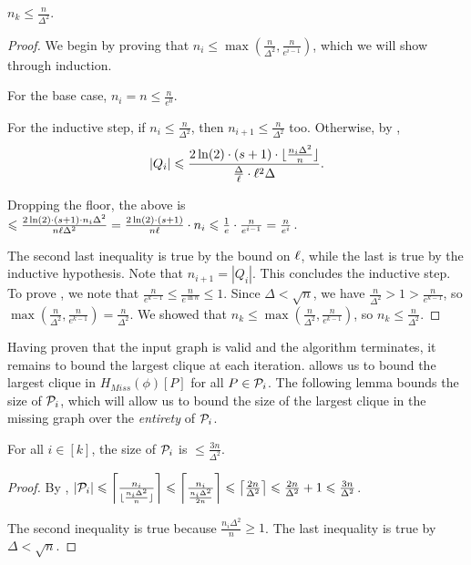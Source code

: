 \documentclass[11pt]{article}
\begin{document}
\begin{lemma}\label{algorithm-finishes}
$n_k\le \frac n{\Delta^2}$. 
\end{lemma}
\begin{proof}
    We begin by proving that $n_i\le \max(\frac n{\Delta^2}, \frac{n}{e^{i-1}})$, which we will show through induction.

    For the base case, $n_i=n\le\frac n{e^0}$. 

    For the inductive step, if $n_i\le \frac n{\Delta^2}$, then $n_{i+1}\le \frac n{\Delta^2}$ too. Otherwise, by , 
    \begin{align*}
        |Q_i|\leqslant\frac{2\ln(2)\cdot(s+1)\cdot\lfloor \frac{n_i\Delta^2}{n}\rfloor}{\frac{\Delta}{\ell}\cdot {\ell}^2\Delta}.
    \end{align*}

    Dropping the floor, the above is $\leqslant \frac{2\ln(2)\cdot (s+1)\cdot n_i\Delta^2}{n{\ell}\Delta^2}=\frac{2\ln(2)\cdot(s+1)}{n{\ell}}\cdot n_i\leqslant \frac 1e\cdot \frac n{e^{i-1}}=\frac n{e^i}$. 

    The second last inequality is true by the bound on ${\ell}$, while the last is true by the inductive hypothesis. Note that $n_{i+1}=|Q_i|$. This concludes the inductive step. \\
    
    To prove , we note that $\frac n{e^{k-1}}\le \frac n{e^{\ln n}}\le 1$. Since $\Delta < \sqrt n$, we have $\frac n{\Delta^2}>1>\frac n{e^{k-1}}$, so $\max\left(\frac n{\Delta^2}, \frac n{e^{k-1}}\right)=\frac n{\Delta^2}$. We showed that $n_k\le\max\left(\frac n{\Delta^2}, \frac n{e^{k-1}}\right)$, so $n_k\le \frac n{\Delta^2}$.
\end{proof}

Having proven that the input graph is valid and the algorithm terminates, it remains to bound the largest clique at each iteration.  allows us to bound the largest clique in $H_{Miss}(\phi)[P]$ for all $P\in \mathcal{P}_i$. The following lemma bounds the size of $\mathcal{P}_i$, which will allow us to bound the size of the largest clique in the missing graph over the \textit{entirety} of $\mathcal{P}_i$. 

\begin{lemma}\label{bound-on-P_i}
For all $i\in [k]$, the size of $\mathcal{P}_i$ is $\le \frac{3n}{\Delta^2}$. 
\end{lemma}
\begin{proof}
By , $|\mathcal{P}_i|\leqslant\left\lceil\frac{n_i}{\lfloor\frac{n_i\Delta^2}n\rfloor}\right\rceil\leqslant\left\lceil\frac{n_i}{\frac{n_i\Delta^2}{2n}}\right\rceil\leqslant\left\lceil \frac{2n}{\Delta^2}\right\rceil\leqslant\frac{2n}{\Delta^2}+1\leqslant\frac{3n}{\Delta^2}$. 

The second inequality is true because $\frac{n_i\Delta^2}n\ge 1$. The last inequality is true by $\Delta<\sqrt n$. 
\end{proof}
\end{document}
